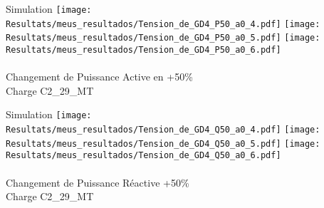 \begin{frame}{Simulation}
\texttt{[image: Resultats/meus\_resultados/Tension\_de\_GD4\_P50\_a0\_4.pdf]}
\hfill
\texttt{[image: Resultats/meus\_resultados/Tension\_de\_GD4\_P50\_a0\_5.pdf]}
\hfill
\texttt{[image: Resultats/meus\_resultados/Tension\_de\_GD4\_P50\_a0\_6.pdf]}
\quad \\\quad\\ \centering \small  Changement de Puissance Active en +50\%\\ Charge C2\_29\_MT
\end{frame}

\begin{frame}{Simulation}
\texttt{[image: Resultats/meus\_resultados/Tension\_de\_GD4\_Q50\_a0\_4.pdf]}
\hfill
\texttt{[image: Resultats/meus\_resultados/Tension\_de\_GD4\_Q50\_a0\_5.pdf]}
\hfill
\texttt{[image: Resultats/meus\_resultados/Tension\_de\_GD4\_Q50\_a0\_6.pdf]}
\quad \\\quad\\ \centering \small  Changement de Puissance Réactive +50\%\\ Charge C2\_29\_MT
\end{frame}



